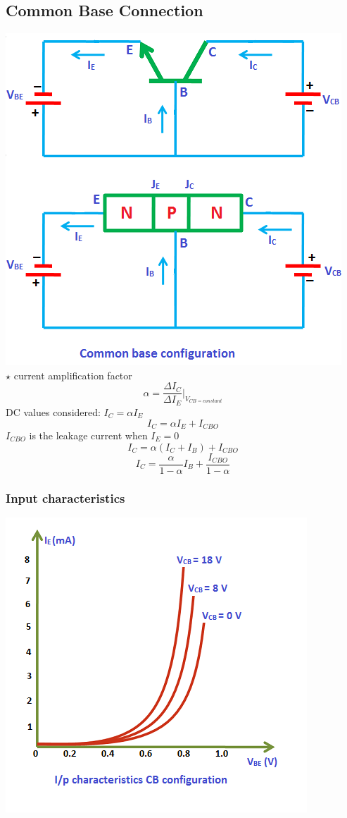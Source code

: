\documentclass[10pt, a4paper]{report}
\begin{document}
	\subsection{Common Base Connection}
	\includegraphics[width=0.8\linewidth]{img/npn cb} \\
	$\star$ current amplification factor $$ \alpha = \dfrac{\Delta I_C}{\Delta I_E} \rvert_{V_{CB = constant}}$$
	DC values considered: $ I_C = \alpha I_E $
	$$I_C = \alpha I_E + I_{CBO}$$
	$ I_{CBO} $ is the leakage current when $ I_E = 0 $
	$$I_C = \alpha (I_C + I_B)+I_{CBO}$$
	$$I_C= \dfrac{\alpha}{1-\alpha}I_B + \dfrac{I_{CBO}}{1-\alpha}$$
	
	\subsubsection{Input characteristics}
	\includegraphics[width=0.6\linewidth]{img/inputcharacteristicscbconfiguration}
\end{document}
